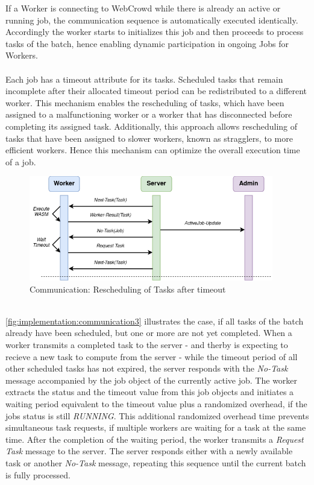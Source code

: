 If a Worker is connecting to WebCrowd while there is already an active or running job, the communication sequence is automatically executed identically. Accordingly the worker starts to initializes this job and then proceeds to process tasks of the batch, hence enabling dynamic participation in ongoing Jobs for Workers.
\\~\\
Each job has a timeout attribute for its tasks. Scheduled tasks that remain incomplete after their allocated timeout period can be redistributed to a different worker. This mechanism enables the rescheduling of tasks, which have been assigned to a malfunctioning worker or a worker that has disconnected before completing its assigned task. Additionally, this approach allows rescheduling of tasks that have been assigned to slower workers, known as stragglers, to more efficient workers. Hence this mechanism can optimize the overall execution time of a job.
\begin{figure}[htbp]
    \centering
    \includegraphics[width=0.95\textwidth]{gfx/figures/communication-timeout.png}
    \caption{Communication: Rescheduling of Tasks after timeout}
    \label{fig:implementation:communication3}
\end{figure}
~\\
\autoref{fig:implementation:communication3} illustrates the case, if all tasks of the batch already have been scheduled, but one or more are not yet completed. When a worker transmits a completed task to the server - and therby is expecting to recieve a new task to compute from the server - while the timeout period of all other scheduled tasks has not expired, the server responds with the \emph{No-Task} message accompanied by the job object of the currently active job. The worker extracts the status and the timeout value from this job objects and initiates a waiting period equivalent to the timeout value plus a randomized overhead, if the jobs status is still \emph{RUNNING}. This additional randomized overhead time prevents simultaneous task requests, if multiple workers are waiting for a task at the same time. After the completion of the waiting period, the worker transmits a \emph{Request Task} message to the server. The server responds either with a newly available task or another \emph{No-Task} message, repeating this sequence until the current batch is fully processed.

